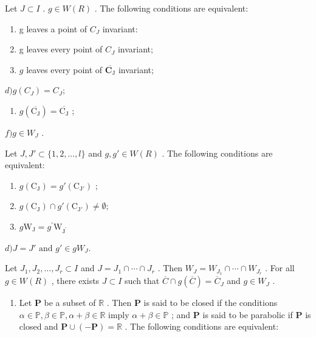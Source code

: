 Let \(J \subset I\) . \(g \in W(R)\) . The following conditions are equivalent:

\begin{enumerate}
\def\labelenumi{\alph{enumi})}
\item
  g leaves a point of \(C_{J}\) invariant:
\item
  g leaves every point of \(C_{J}\) invariant;
\item
  \(g\) leaves every point of \(\overline{\mathbf{C}_{\mathrm{J}}}\) invariant;
\end{enumerate}

\(d) g(C_{J}) = C_{J};\)

\begin{enumerate}
\def\labelenumi{\alph{enumi})}
\setcounter{enumi}{4}
\tightlist
\item
  \(g(\overline{\mathrm{C}_{\mathrm{J}}}) = \overline{\mathrm{C}_{\mathrm{J}}}\) ;
\end{enumerate}

\(f) g \in W_{J}\) .

Let \(J, J' \subset \{1, 2, \ldots, l\}\) and \(g, g' \in W(R)\) . The following conditions are equivalent:

\begin{enumerate}
\def\labelenumi{\alph{enumi})}
\item
  \(g(\mathrm{C}_{\mathrm{J}}) = g'(\mathrm{C}_{\mathrm{J}'})\) ;
\item
  \(g(\mathrm{C}_{\mathrm{J}})\cap g'(\mathrm{C}_{\mathrm{J}'})\neq \emptyset ;\)
\item
  \(g\mathrm{W}_{\mathrm{J}} = g^{\prime}\mathrm{W}_{\mathrm{J}^{\prime}}\)
\end{enumerate}

\(d) J = J' \text{ and } g' \in gW_J.\)

Let \(J_1, J_2, \ldots, J_r \subset I\) and \(J = J_1 \cap \cdots \cap J_r\) . Then \(W_J = W_{J_1} \cap \cdots \cap W_{J_r}\) . For all \(g \in W(R)\) , there exists \(J \subset I\) such that \(\overline{C} \cap g(\overline{C}) = \overline{C}_J\) and \(g \in W_J\) .

\begin{enumerate}
\def\labelenumi{\arabic{enumi})}
\setcounter{enumi}{19}
\tightlist
\item
  Let \(\mathbf{P}\) be a subset of \(\mathbb{R}\) . Then \(\mathbf{P}\) is said to be closed if the conditions \(\alpha \in \mathbb{P}, \beta \in \mathbb{P}, \alpha + \beta \in \mathbb{R}\) imply \(\alpha + \beta \in \mathbb{P}\) ; and \(\mathbf{P}\) is said to be parabolic if \(\mathbf{P}\) is closed and \(\mathbf{P} \cup (-\mathbf{P}) = \mathbb{R}\) . The following conditions are equivalent:
\end{enumerate}

